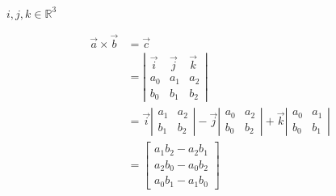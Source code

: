 \documentclass{article}
\newcommand{\mat}[4]{
  \left| \begin{array}{cc}
    #1 & #2 \\
    #3 & #4
  \end{array} \right|
}
\begin{document}
$ i, j, k \in \mathbb{R}^3 $


\begin{align*}
  \vec{a} \times \vec{b}  & = \vec{c}\\
  & =
  \left| \begin{array}{ccc}
    \vec{i}   & \vec{j}   & \vec{k}   \\
    a_0       & a_1       & a_2       \\
    b_0       & b_1       & b_2
  \end{array} \right| \\
  & = \vec{i} \mat{a_1}{a_2}{b_1}{b_2} - \vec{j} \mat{a_0}{a_2}{b_0}{b_2} + \vec{k}\mat{a_0}{a_1}{b_0}{b_1} \\
  & = 
  \left[ \begin{array}{ccc}
    a_1 b_2 - a_2 b_1     \\
    a_2 b_0 - a_0 b_2    \\
    a_0 b_1 - a_1 b_0
  \end{array} \right]
\end{align*}
\end{document}
